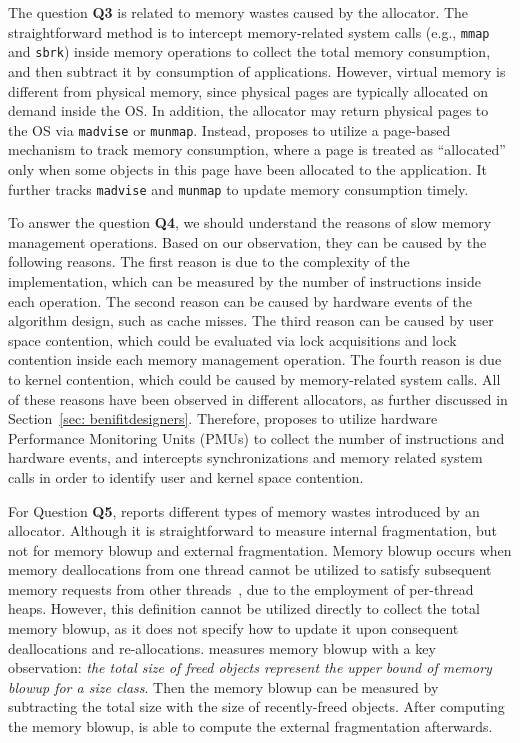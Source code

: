 The question \textbf{Q3} is related to memory wastes caused by the allocator. The straightforward method is to intercept memory-related system calls (e.g., \texttt{mmap} and \texttt{sbrk}) inside memory operations to collect the total memory consumption, and then subtract it by  consumption of applications. However, virtual memory is different from physical memory, since physical pages are typically allocated on demand inside the OS. In addition, the allocator may return physical pages to the OS via \texttt{madvise} or \texttt{munmap}. Instead, \MP{} proposes to utilize a page-based mechanism to track memory consumption, where a page is treated as ``allocated'' only when some objects in this page have been allocated to the application. It further tracks \texttt{madvise} and \texttt{munmap} to update memory consumption timely. 

To answer the question \textbf{Q4}, we should understand the reasons of slow memory management operations. Based on our observation, they can be caused by the following reasons. The first reason is due to the complexity of the implementation, which can be measured by the number of instructions inside each operation. The second reason can be caused by hardware events of the algorithm design, such as cache misses. The third reason can be caused by user space contention, which could be evaluated via lock acquisitions and lock contention inside each memory management operation. The fourth reason is due to kernel contention, which could be caused by memory-related system calls. All of these reasons have been observed in different allocators, as further discussed in Section~\ref{sec: benifitdesigners}.  
Therefore, \MP{} proposes to utilize hardware Performance Monitoring Units (PMUs) to collect the number of instructions and hardware events, and intercepts synchronizations and memory related system calls in order to identify user and kernel space contention. 

For Question \textbf{Q5}, \MP{} reports different types of memory wastes introduced by an allocator. Although it is straightforward to measure internal fragmentation, but not for memory blowup and external fragmentation. Memory blowup occurs when memory deallocations from one thread cannot be utilized to satisfy subsequent memory requests from other threads~\cite{Hoard}, due to the employment of per-thread heaps. However, this definition cannot be utilized directly to collect the total memory blowup, as it does not specify how to update it upon consequent deallocations and re-allocations. \MP{} measures memory blowup with a key observation: \textit{the total size of freed objects represent the upper bound of memory blowup for a size class}. Then the memory blowup can be measured by subtracting the total size with the size of recently-freed objects. After computing the memory blowup, \MP{} is able to compute the external fragmentation afterwards. 



